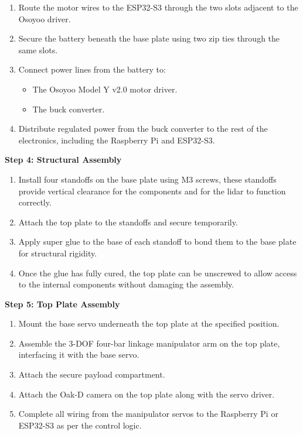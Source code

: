 \documentclass{article}
\begin{document}
\begin{enumerate}
  \item Route the motor wires to the ESP32-S3 through the two slots adjacent to the Osoyoo driver. 

  \item Secure the battery beneath the base plate using two zip ties through the same slots. 
  
  \item Connect power lines from the battery to: 
  
  \begin{itemize}
    \item The Osoyoo Model Y v2.0 motor driver. 
    
    \item The buck converter. 
  \end{itemize}
  
  \item Distribute regulated power from the buck converter to the rest of the electronics, including the Raspberry Pi and ESP32-S3. 
\end{enumerate}

\textbf{Step 4: Structural Assembly }

\begin{enumerate}
  \item Install four standoffs on the base plate using M3 screws, these standoffs provide vertical clearance for the components and for the lidar to function correctly. 

  \item Attach the top plate to the standoffs and secure temporarily. 
  
  \item Apply super glue to the base of each standoff to bond them to the base plate for structural rigidity. 
  
  \item Once the glue has fully cured, the top plate can be unscrewed to allow access to the internal components without damaging the assembly. 
\end{enumerate}

\textbf{Step 5: Top Plate Assembly }

\begin{enumerate}
  \item Mount the base servo underneath the top plate at the specified position. 

  \item Assemble the 3-DOF four-bar linkage manipulator arm on the top plate, interfacing it with the base servo. 
  
  \item Attach the secure payload compartment. 
  
  \item Attach the Oak-D camera on the top plate along with the servo driver. 
  
  \item Complete all wiring from the manipulator servos to the Raspberry Pi or ESP32-S3 as per the control logic. 
\end{enumerate}
\end{document}
